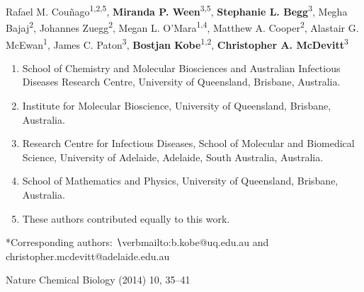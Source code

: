 Rafael M. Couñago\textsuperscript{1,2,5}, \textbf{Miranda P. Ween}\textsuperscript{3,5}, \textbf{Stephanie L. Begg}\textsuperscript{3}, Megha Bajaj\textsuperscript{2}, Johannes Zuegg\textsuperscript{2}, Megan L. O’Mara\textsuperscript{1,4}, Matthew A. Cooper\textsuperscript{2}, Alastair G. McEwan\textsuperscript{1}, James C. Paton\textsuperscript{3}, \textbf{Bostjan Kobe}\textsuperscript{1,2}, \textbf{Christopher A. McDevitt}\textsuperscript{3}
\begin{enumerate}
\item School of Chemistry and Molecular Biosciences and Australian Infectious Diseases Research Centre, University of Queensland, Brisbane, Australia.
\item Institute for Molecular Bioscience, University of Queensland, Brisbane, Australia.
\item Research Centre for Infectious Diseases, School of Molecular and Biomedical Science, University of Adelaide, Adelaide, South Australia, Australia.
\item School of Mathematics and Physics, University of Queensland, Brisbane, Australia.
\item These authors contributed equally to this work.
\end{enumerate}

*Corresponding authors: ∖verb{mailto:b.kobe@uq.edu.au} and christopher.mcdevitt@adelaide.edu.au 

Nature Chemical Biology (2014) 10, 35–41